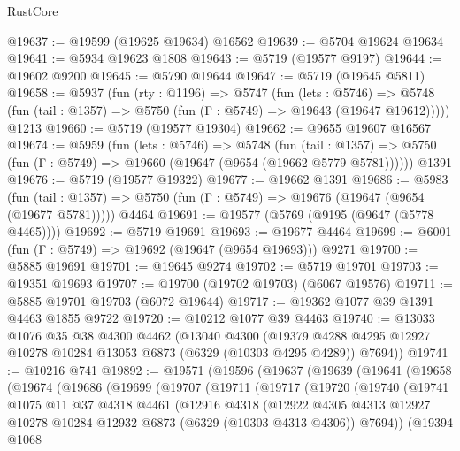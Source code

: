 \begin{lexlean}{RustCore}
\begin{coremodule}
@19637 := @19599 (@19625 @19634) @16562
@19639 := @5704 @19624 @19634
@19641 := @5934 @19623 @1808
@19643 := @5719 (@19577 @9197)
@19644 := @19602 @9200
@19645 := @5790 @19644
@19647 := @5719 (@19645 @5811)
@19658 := @5937
    (fun (rty : @1196) =>
    @5747
      (fun (lets : @5746) =>
      @5748 (fun (tail : @1357) => @5750 (fun (Γ : @5749) => @19643 (@19647 @19612)))))
    @1213
@19660 := @5719 (@19577 @19304)
@19662 := @9655 @19607 @16567
@19674 := @5959
    (fun (lets : @5746) =>
    @5748
      (fun (tail : @1357) =>
      @5750 (fun (Γ : @5749) => @19660 (@19647 (@9654 (@19662 @5779 @5781))))))
    @1391
@19676 := @5719 (@19577 @19322)
@19677 := @19662 @1391
@19686 := @5983
    (fun (tail : @1357) => @5750 (fun (Γ : @5749) => @19676 (@19647 (@9654 (@19677 @5781)))))
    @4464
@19691 := @19577 (@5769 (@9195 (@9647 (@5778 @4465))))
@19692 := @5719 @19691
@19693 := @19677 @4464
@19699 := @6001 (fun (Γ : @5749) => @19692 (@19647 (@9654 @19693))) @9271
@19700 := @5885 @19691
@19701 := @19645 @9274
@19702 := @5719 @19701
@19703 := @19351 @19693
@19707 := @19700 (@19702 @19703) (@6067 @19576)
@19711 := @5885 @19701 @19703 (@6072 @19644)
@19717 := @19362 @1077 @39 @1391 @4463 @1855 @9722
@19720 := @10212 @1077 @39 @4463
@19740 := @13033
    @1076
    @35
    @38
    @4300
    @4462
    (@13040
      @4300
      (@19379 @4288 @4295 @12927 @10278 @10284 @13053 @6873 (@6329 (@10303 @4295 @4289)) @7694))
@19741 := @10216 @741
@19892 := @19571
    (@19596
      (@19637
        (@19639
          (@19641
            (@19658
              (@19674
                (@19686
                  (@19699
                    (@19707
                      (@19711
                        (@19717
                          (@19720
                            (@19740
                              (@19741
                                @1075
                                @11
                                @37
                                @4318
                                @4461
                                (@12916
                                  @4318
                                  (@12922
                                    @4305
                                    @4313
                                    @12927
                                    @10278
                                    @10284
                                    @12932
                                    @6873
                                    (@6329 (@10303 @4313 @4306))
                                    @7694))
                                (@19394
                                  @1068

\end{coremodule}
\end{lexlean}
